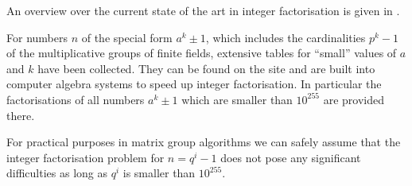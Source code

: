 An overview over the current state of the art in integer factorisation
is given in \cite{gabifaktorisierung}.

For numbers $n$ of the special form $a^k \pm 1$, which includes the
cardinalities $p^k - 1$ of the multiplicative groups of finite fields,
extensive tables for ``small'' values of $a$ and $k$ have been
collected. They can be found on the site \cite{brentfact} and are
built into computer algebra systems to speed up integer factorisation.
In particular the factorisations of all numbers $a^k \pm 1$ which are
smaller than $10^{255}$ are provided there.

For practical purposes in matrix group algorithms 
we can safely assume that the integer factorisation
problem for $n = q^i - 1$ 
does not pose any significant difficulties as long as $q^i$ is
smaller than $10^{255}$.


